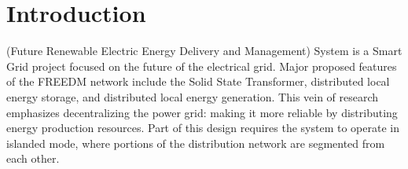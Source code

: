 \section{Introduction}
%
%



% 
% 
% 
% 
 (Future Renewable Electric Energy Delivery and Management) System
is a Smart Grid project focused on the future of the electrical grid. Major proposed features
of the FREEDM network include the Solid State Transformer, distributed local energy storage,
and distributed local energy generation\cite{FREEDMMIGRATION}. This vein of research emphasizes decentralizing the
power grid: making it more reliable by distributing energy production resources. Part of this
design requires the system to operate in islanded mode, where portions of the distribution
network are segmented from each other.

